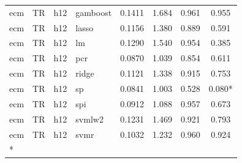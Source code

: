 \begin{ThreePartTable}
\begin{longtable}[t]{llclcccc}
ecm & TR & h12 & gamboost & 0.1411 & 1.684 & 0.961 & 0.955\\
ecm & TR & h12 & lasso & 0.1156 & 1.380 & 0.889 & 0.591\\
ecm & TR & h12 & lm & 0.1290 & 1.540 & 0.954 & 0.385\\
ecm & TR & h12 & pcr & 0.0870 & 1.039 & 0.854 & 0.611\\
ecm & TR & h12 & ridge & 0.1121 & 1.338 & 0.915 & 0.753\\
ecm & TR & h12 & sp & 0.0841 & 1.003 & 0.528 & 0.080*\\
ecm & TR & h12 & spi & 0.0912 & 1.088 & 0.957 & 0.673\\
ecm & TR & h12 & svmlw2 & 0.1231 & 1.469 & 0.921 & 0.793\\
ecm & TR & h12 & svmr & 0.1032 & 1.232 & 0.960 & 0.924\\*
\end{longtable}
\end{ThreePartTable}
\endgroup{}
